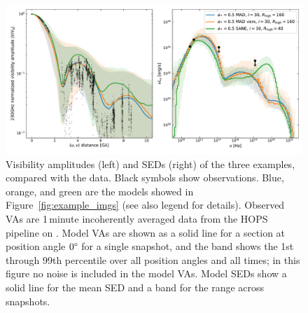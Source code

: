 
\begin{figure}
  \centering
  \includegraphics[width=\textwidth]{figures/example_vas_seds.pdf}
  \caption{Visibility amplitudes (left) and SEDs (right) of the three examples, compared with the data.  Black symbols show observations.  Blue, orange, and green are the models showed in Figure~\ref{fig:example_imgs} (see also legend for details).  Observed VAs are 1\,minute incoherently averaged data from the HOPS pipeline on \aprilvii.  Model VAs are shown as a solid line for a section at position angle $0\degree$ for a single snapshot, and the band shows the 1st through 99th percentile over all position angles and all times; in this figure no noise is included in the model VAs.  Model SEDs show a solid line for the mean SED and a band for the range across snapshots.}
  \label{fig:example_vas_seds}
\end{figure}

